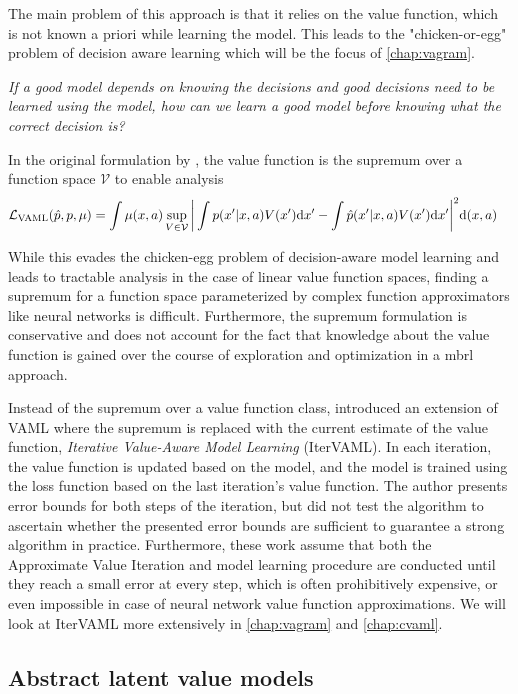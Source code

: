 The main problem of this approach is that it relies on the value function, which is not known a priori while learning the model. 
This leads to the "chicken-or-egg" problem of decision aware learning which will be the focus of \autoref{chap:vagram}.

\emph{If a good model depends on knowing the decisions and good decisions need to be learned using the model, how can we learn a good model before knowing what the correct decision is?}

In the original formulation by \textcite{vaml}, the value function is the supremum over a function space $\mathcal{V}$ to enable analysis
\begin{align}
    &\mathcal{L}_\text{VAML}(\hat{p}, p, \mu) = \int \mu(x,a) \sup_{V\in \mathcal{V}}\bigg|\int p(x'|x,a)V(x')\mathrm{d}x'  - \int \hat{p}(x'|x,a) V(x') \mathrm{d}x'\bigg|^2 \mathrm{d} (x,a)
\end{align}

While this evades the chicken-egg problem of decision-aware model learning and leads to tractable analysis in the case of linear value function spaces, finding a supremum for a function space parameterized by complex function approximators like neural networks is difficult.
Furthermore, the supremum formulation is conservative and does not account for the fact that knowledge about the value function is gained over the course of exploration and optimization in a \ac{mbrl} approach.

Instead of the supremum over a value function class, \textcite{itervaml} introduced an extension of VAML where the supremum is replaced with the current estimate of the value function, \emph{Iterative Value-Aware Model Learning} (IterVAML).
In each iteration, the value function is updated based on the model, and the model is trained using the loss function based on the last iteration's value function.
The author presents error bounds for both steps of the iteration, but did not test the algorithm to ascertain whether the presented error bounds are sufficient to guarantee a strong algorithm in practice. 
Furthermore, these work assume that both the Approximate Value Iteration and model learning procedure are conducted until they reach a small error at every step, which is often prohibitively expensive, or even impossible in case of neural network value function approximations.
We will look at IterVAML more extensively in \autoref{chap:vagram} and \autoref{chap:cvaml}.


\subsection{Abstract latent value models}

